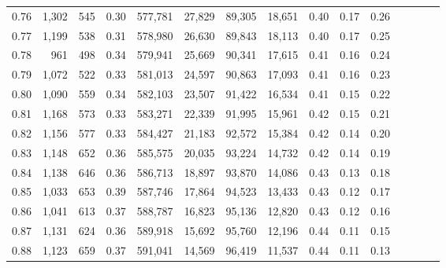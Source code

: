 \begin{tabular}{rrrcrrrrrrrrrrr}
0.76 &   1,302 &    545 &                                       0.30 &  577,781 &   27,829 &   89,305 &   18,651 &  0.40 &  0.17 &                         0.26 \\
0.77 &   1,199 &    538 &                                       0.31 &  578,980 &   26,630 &   89,843 &   18,113 &  0.40 &  0.17 &                         0.25 \\
0.78 &     961 &    498 &                                       0.34 &  579,941 &   25,669 &   90,341 &   17,615 &  0.41 &  0.16 &                         0.24 \\
0.79 &   1,072 &    522 &                                       0.33 &  581,013 &   24,597 &   90,863 &   17,093 &  0.41 &  0.16 &                         0.23 \\
0.80 &   1,090 &    559 &                                       0.34 &  582,103 &   23,507 &   91,422 &   16,534 &  0.41 &  0.15 &                         0.22 \\
0.81 &   1,168 &    573 &                                       0.33 &  583,271 &   22,339 &   91,995 &   15,961 &  0.42 &  0.15 &                         0.21 \\
0.82 &   1,156 &    577 &                                       0.33 &  584,427 &   21,183 &   92,572 &   15,384 &  0.42 &  0.14 &                         0.20 \\
0.83 &   1,148 &    652 &                                       0.36 &  585,575 &   20,035 &   93,224 &   14,732 &  0.42 &  0.14 &                         0.19 \\
0.84 &   1,138 &    646 &                                       0.36 &  586,713 &   18,897 &   93,870 &   14,086 &  0.43 &  0.13 &                         0.18 \\
0.85 &   1,033 &    653 &                                       0.39 &  587,746 &   17,864 &   94,523 &   13,433 &  0.43 &  0.12 &                         0.17 \\
0.86 &   1,041 &    613 &                                       0.37 &  588,787 &   16,823 &   95,136 &   12,820 &  0.43 &  0.12 &                         0.16 \\
0.87 &   1,131 &    624 &                                       0.36 &  589,918 &   15,692 &   95,760 &   12,196 &  0.44 &  0.11 &                         0.15 \\
0.88 &   1,123 &    659 &                                       0.37 &  591,041 &   14,569 &   96,419 &   11,537 &  0.44 &  0.11 &                         0.13 \\

\end{tabular}
